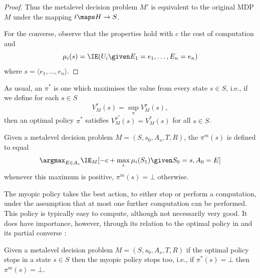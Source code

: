 \begin{proof}
Thus the metalevel decision problem $M'$ is equivalent to the original MDP $M$
under the mapping $t\maps H\to S$.

For the converse, observe that the properties hold with $c$ the cost of computation
and \[\mu_i(s) = \IE(U_i\given E_1=e_1,\dots,E_n=e_n)\] where $s=\langle e_1,\dots,e_n \rangle$.
\end{proof}



As usual, an  $\pi^*$ is one which maximises 
the value from every state $s\in S$, i.e., if we define for each $s\in S$
\[
	V^*_M(s) = \sup_\pi V^\pi_M(s),
\]
then an optimal policy $\pi^*$ satisfies $V^{\pi^*}_M(s) = V^*_M(s)$
for all $s\in S$. 





\begin{dfn}
	Given a metalevel decision problem $M=(S,s_0,A_s,T,R)$,
	the  $\pi^m(s)$ is defined to equal
	\begin{equation}\label{eq:myopic}
		\argmax_{E\in A_s} \IE_M[ -c + \max_i \mu_i(S_1) \given S_0 = s, A_0 = E]		
	\end{equation}
	whenever this maximum is positive, $\pi^m(s)=\bot$ otherwise.
\end{dfn}

The myopic policy takes the best action, to either stop or perform a computation,
under the assumption that at most one further computation can be performed.  This policy
is typically easy to compute, although not necessarily very good.  It does have
importance, however, through its relation to the optimal policy in 
and its partial converse :

	
\begin{thm}\label{thm:optimal-myopic}
	Given a metalevel decision problem $M=(S,s_0,A_s,T,R)$
	if the optimal policy stops in a state $s\in S$
	then the myopic policy stops too, i.e., if $\pi^*(s)=\bot$ then $\pi^m(s)=\bot$.
\end{thm}

